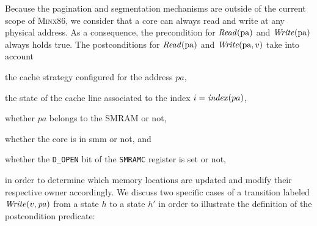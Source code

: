 Because the pagination and segmentation mechanisms are outside of the current
scope of {\scshape Minx86}, we consider that a core can always read and write at
any physical address.
%
As a consequence, the precondition for \( \mathit{Read}(\mathrm{pa}) \) and
\( \mathit{Write}(\mathrm{pa}) \) always holds true.
%
The postconditions for \( \mathit{Read}(\mathrm{pa}) \) and
\( \mathit{Write}(\mathrm{pa}, v) \) take into account
%
\begin{inparaenum}[(1)]
\item the cache strategy configured for the address \( pa \),
\item the state of the cache line associated to the index
  \( i = \mathit{index}(pa) \),
\item whether \( pa \) belongs to the SMRAM or not,
\item whether the core is in \ac{smm} or not, and
\item whether the \texttt{D\_OPEN} bit of the \texttt{SMRAMC} register is set or
  not,
\end{inparaenum}
%
in order to determine which memory locations are updated and modify their
respective owner accordingly.
%
We discuss two specific cases of a transition labeled
\( \mathit{Write}(v, \mathit{pa}) \) from a state \( h \) to a state \( h' \) in
order to illustrate the definition of the postcondition predicate:
%
